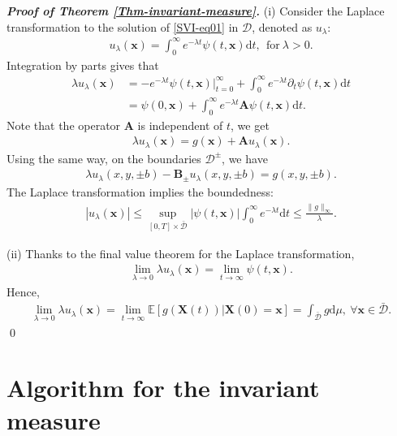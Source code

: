 \documentclass[12pt]{article}
\numberwithin{equation}{section}
\def \E{\mathbb E}
\def \AA {\mathbf A}
\def \BB {\mathbf B}
\def\d{\mathrm{d}}
\begin{document}
{\noindent \it \bf Proof of Theorem \ref{Thm-invariant-measure}.}  
(i) Consider the Laplace transformation to the solution of \eqref{SVI-eq01} in $\mathcal{D}$, 
denoted as $u_{\lambda}$: 
\begin{align*}
	u_{\lambda}(\mathbf{x}) = \int_{0}^{\infty} e^{-\lambda t}\psi(t,\mathbf{x}) \d t, ~~\text{for}~\lambda>0.
\end{align*}
Integration by parts gives that 
\begin{align*}
	\lambda u_{\lambda}(\mathbf{x}) 
	& = -e^{-\lambda t}\psi(t,\mathbf{x})\Big|_{t=0}^{\infty} + 
	\int_{0}^{\infty} e^{-\lambda t}\partial_{t} \psi(t,\mathbf{x}) \d t\\
	& = \psi(0, \mathbf{x}) + \int_{0}^{\infty}e^{-\lambda t}\AA \psi(t,\mathbf{x}) \d t.
\end{align*}
Note that the operator $\AA$ is independent of $t$, we get
\begin{align*}
	\lambda u_{\lambda}(\mathbf{x}) 
	= g(\mathbf{x}) + \AA u_{\lambda}(\mathbf{x}). 
\end{align*}
Using the same way, on the boundaries $\mathcal{D}^\pm$, we have 
\begin{align*}
	\lambda u_{\lambda}(x,y,\pm b) 
	- \BB_{\pm} u_{\lambda}(x,y,\pm b)
	= g(x,y,\pm b). 
\end{align*}
The Laplace transformation implies the boundedness:
\begin{align*}
	|u_{\lambda }(\mathbf{x})| 
	\leq \sup_{[0,T]\times \bar{\mathcal{D}}} |\psi(t, \mathbf{x})| \int_{0}^{\infty}e^{-\lambda t}\d t
	\leq \frac{\| g \|_{\infty}}{\lambda}. 
\end{align*}

(ii) Thanks to the final value theorem for the Laplace transformation, 
\begin{align*}
	\lim_{\lambda \rightarrow 0}\lambda u_{\lambda}(\mathbf{x}) 
	= \lim_{t\rightarrow \infty} \psi(t, \mathbf{x}). 
\end{align*}
Hence,
\begin{align*}
	\lim_{\lambda \rightarrow 0}\lambda u_{\lambda}(\mathbf{x}) 
	= \lim_{t\rightarrow \infty} \E[g(\mathbf{X}(t)) | \mathbf{X}(0) = \mathbf{x}]
	= \int_{\bar{\mathcal{D}}}g\d \mu,~\forall \mathbf{x}\in\bar{\mathcal{D}}.  
\end{align*} \qed

\section{Algorithm for the invariant measure}\label{app-A02}
\setcounter{equation}{0}
\renewcommand{\theequation}{B.\arabic{equation}}
\setcounter{figure}{0}
\renewcommand{\thefigure}{B-\arabic{figure}}
\end{document}
